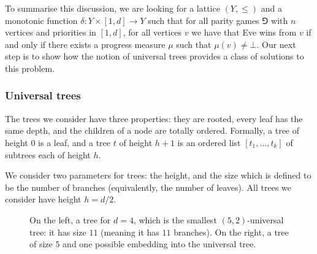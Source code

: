 To summarise this discussion, we are looking for a lattice $(Y,\le)$ and a monotonic function $\delta : Y \times [1,d] \to Y$ 
such that for all parity games $\Game$ with $n$ vertices and priorities in $[1,d]$, 
for all vertices $v$ we have that Eve wins from $v$ if and only if there exists a progress measure $\mu$ such that $\mu(v) \neq \bot$.
Our next step is to show how the notion of universal trees provides a class of solutions to this problem.

\subsubsection*{Universal trees}
The trees we consider have three properties: 
they are rooted, every leaf has the same depth, and the children of a node are totally ordered.
Formally, a tree of height $0$ is a leaf,
and a tree $t$ of height $h + 1$ is an ordered list $[t_1,\dots,t_k]$ of subtrees each of height $h$.

We consider two parameters for trees: the height, and the size which is defined to be the number of branches (equivalently, the number of leaves).
All trees we consider have height $h = d/2$.

\begin{figure*}[!ht]
\centering
{}
\caption{On the left, a tree for $d = 4$, which is the smallest $(5,2)$-universal tree:
it has size $11$ (meaning it has $11$ branches).
On the right, a tree of size $5$ and one possible embedding into the universal tree.}
\label{3-fig:example_universal}
\end{figure*}

